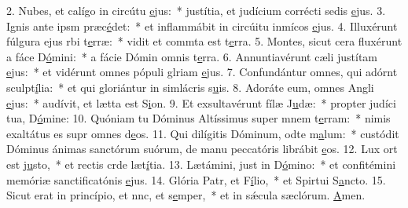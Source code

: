 2. Nubes, et calígo in circútu \uline{e}jus:~* justítia, et judícium corrécti sedis \uline{e}jus.
3. Ignis ante ipsm præc\uline{é}det:~* et inflammábit in circúitu inmícos \uline{e}jus.
4. Illuxérunt fúlgura ejus rbi t\uline{e}rræ:~* vidit et commta est t\uline{e}rra.
5. Montes, sicut cera fluxérunt a fáce D\uline{ó}mini:~* a fácie Dómin omnis t\uline{e}rra.
6. Annuntiavérunt cæli justítam \uline{e}jus:~* et vidérunt omnes pópuli glriam \uline{e}jus.
7. Confundántur omnes, qui adórnt sculpt\uline{í}lia:~* et qui gloriántur in simlácris s\uline{u}is.
8. Adoráte eum, omnes Angli \uline{e}jus:~* audívit, et lætta est S\uline{i}on.
9. Et exsultavérunt fílæ J\uline{u}dæ:~* propter judíci tua, D\uline{ó}mine:
10. Quóniam tu Dóminus Altíssimus super mnem t\uline{e}rram:~* nimis exaltátus es supr omnes d\uline{e}os.
11. Qui dilígitis Dóminum, odte m\uline{a}lum:~* custódit Dóminus ánimas sanctórum suórum, de manu peccatóris librábit \uline{e}os.
12. Lux ort est j\uline{u}sto,~* et rectis crde læt\uline{í}tia.
13. Lætámini, just in D\uline{ó}mino:~* et confitémini memóriæ sanctificatónis \uline{e}jus.
14. Glória Patr, et F\uline{í}lio,~* et Spirtui S\uline{a}ncto.
15. Sicut erat in princípio, et nnc, et s\uline{e}mper,~* et in sǽcula sæclórum. \uline{A}men.
